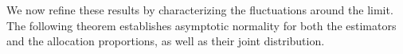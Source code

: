 \documentclass[11pt]{article}
\theoremstyle{plain}
\newtheorem{theorem}{Theorem}[section]
\theoremstyle{definition}
\newtheorem{proposition}[theorem]{Proposition}
\begin{document}
%



We now refine these results by characterizing the fluctuations around the limit. The following theorem establishes asymptotic normality for both the estimators and the allocation proportions, as well as their joint distribution.
\end{document}
